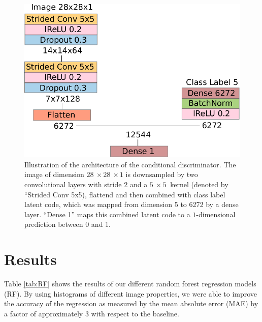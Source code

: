 \documentclass[10pt,conference,compsocconf]{IEEEtran}
\begin{document}
\begin{figure}
    \centering
    \includegraphics[width=0.73\columnwidth]{assets/cdis_arch.pdf}
    \caption{Illustration of the architecture of the conditional discriminator. The image of dimension $\SI{28}{}\times\SI{28}{}\times1$ is downsampled by two convolutional layers with stride \SI{2}{} and a $\SI{5}{}\times\SI{5}{}$ kernel (denoted by ``Strided Conv 5x5), flattend and then combined with class label latent code, which was mapped from dimension \SI{5}{} to \SI{6272}{} by a dense layer. ``Dense 1'' maps this combined latent code to a $1$-dimensional prediction between \SI{0}{} and \SI{1}{}.}
    \label{fig:cdis_arch}
\end{figure}








\section{Results}
\label{sec:results}

Table \ref{tab:RF} shows the results of our different random forest regression models (RF). By using histograms of different image properties, we were able to improve the accuracy of the regression as measured by the mean absolute error (MAE) by a factor of approximately 3 with respect to the baseline.
\end{document}
